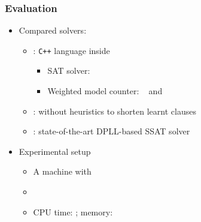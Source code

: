 \renewcommand{\nrandom}{\num{700}}
\renewcommand{\napplication}{\num{212}}
\newcommand{\ntoilet}{\num{77}}
\newcommand{\nmaxcount}{\num{26}}
\newcommand{\nsandcastle}{\num{25}}
\newcommand{\nconformant}{\num{24}}
\newcommand{\nmpec}{\num{60}}

\begin{frame}
    \frametitle{Evaluation}
    \begin{itemize}
        \item Compared solvers:
              \pause
              \begin{itemize}
                  \item \erssat: \texttt{C++} language inside~\abc~\cite{ABC}
                        \pause
                        \begin{itemize}
                            \item SAT solver: ~\cite{Een2003Solver}
                                  \pause
                            \item Weighted model counter: \cachet~\cite{Sang2004} and \cudd~\cite{Darwiche2002KnowledgeCompilation}
                                  \pause
                        \end{itemize}
                  \item \erssatb: \erssat without heuristics to shorten learnt clauses
                        \pause
                  \item \dcssat: state-of-the-art DPLL-based SSAT solver
                        \pause
              \end{itemize}
        \item Experimental setup
              \pause
              \begin{itemize}
                  \item A machine with~\machineSpec
                        \pause
                  \item \osInfo
                        \pause
                  \item CPU time: \timelimit; memory: \memlimit
              \end{itemize}
    \end{itemize}
\end{frame}

